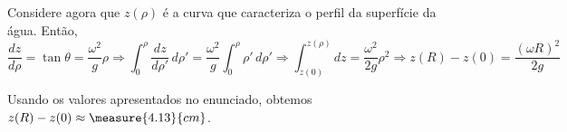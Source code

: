 \begin{question}
\begin{solution}
      Considere agora que $z(\rho)$ é a curva que caracteriza o perfil da superfície da água.
      Então,
      \begin{equation*}
        \frac{dz}{d\rho} = \tan\theta = \frac{\omega^2}{g}\rho
          \Rightarrow
        \int_0^{\rho} \frac{dz}{d\rho'}\, d\rho' = \frac{\omega^2}{g} \int_0^{\rho} \rho'\,d\rho'
          \Rightarrow
        \int_{z(0)}^{z(\rho)}dz = \frac{\omega^2}{2g}\rho^2
          \Rightarrow
        z(R) - z(0) = \frac{(\omega R)^2}{2g}
      \end{equation*}

      Usando os valores apresentados no enunciado, obtemos $z(R) - z(0) \approx \measure{4.13}{cm}$.
    \end{solution}
\end{question}